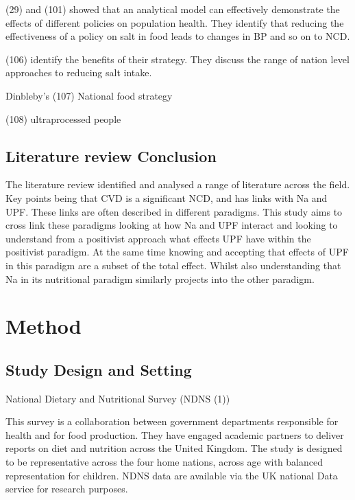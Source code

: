 \documentclass[
]{article}
\begin{document}
(29) and (101) showed that an analytical model can effectively
demonstrate the effects of different policies on population health. They
identify that reducing the effectiveness of a policy on salt in food
leads to changes in BP and so on to NCD.

(106) identify the benefits of their strategy. They discuss the range of
nation level approaches to reducing salt intake.

Dinbleby's (107) National food strategy

(108) ultraprocessed people

\hypertarget{literature-review-conclusion}{%
\subsection{Literature review
Conclusion}\label{literature-review-conclusion}}

The literature review identified and analysed a range of literature
across the field. Key points being that CVD is a significant NCD, and
has links with Na and UPF. These links are often described in different
paradigms. This study aims to cross link these paradigms looking at how
Na and UPF interact and looking to understand from a positivist approach
what effects UPF have within the positivist paradigm. At the same time
knowing and accepting that effects of UPF in this paradigm are a subset
of the total effect. Whilst also understanding that Na in its
nutritional paradigm similarly projects into the other paradigm.

\newpage

\hypertarget{method}{%
\section{Method}\label{method}}

\hypertarget{study-design-and-setting}{%
\subsection{Study Design and Setting}\label{study-design-and-setting}}

National Dietary and Nutritional Survey (NDNS (1))

This survey is a collaboration between government departments
responsible for health and for food production. They have engaged
academic partners to deliver reports on diet and nutrition across the
United Kingdom. The study is designed to be representative across the
four home nations, across age with balanced representation for children.
NDNS data are available via the UK national Data service for research
purposes.
\end{document}

